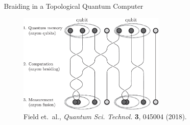 \documentclass[xcolor=dvipsnames,10pt,aspectratio=169]{beamer}
\begin{document}
  \begin{frame}{Braiding in a Topological Quantum Computer}
      \begin{figure}
        \includegraphics[width=0.65\textwidth]{./figures/braiding.jpg}
        \caption*{\footnotesize Field et.\ al., \textit{Quantum Sci. Technol.} \textbf{3}, 045004 (2018).}
      \end{figure}

  \end{frame}
\end{document}
